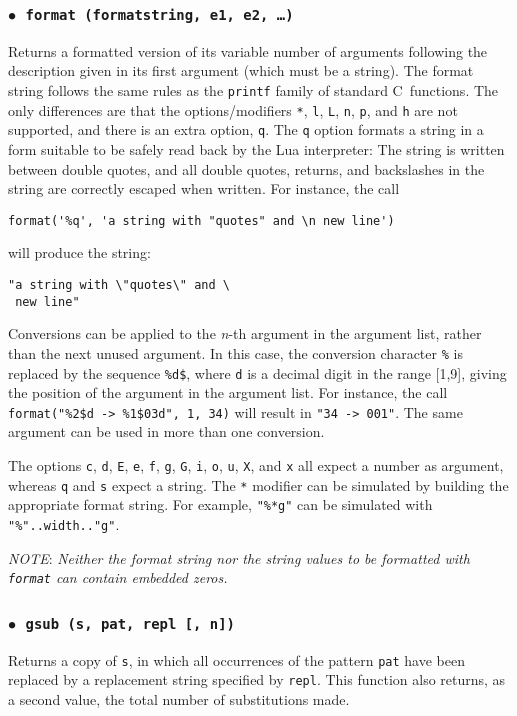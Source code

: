 \documentclass[11pt]{article}
\newcommand{\M}[1]{\rm\emph{#1}}
\newcommand{\T}[1]{{\tt #1}}
\newcommand{\Deffunc}[1]{\index{#1}}
\newcommand{\ff}{$\bullet$\ }
\newcommand{\NOTE}{\par\noindent\emph{NOTE}: }
\begin{document}
\subsubsection*{\ff \T{format (formatstring, e1, e2, \ldots)}}\Deffunc{format}
\label{format}
Returns a formatted version of its variable number of arguments
following the description given in its first argument (which must be a string).
The format string follows the same rules as the \verb|printf| family of
standard C~functions.
The only differences are that the options/modifiers
\verb|*|, \verb|l|, \verb|L|, \verb|n|, \verb|p|,
and \verb|h| are not supported,
and there is an extra option, \verb|q|.
The \verb|q| option formats a string in a form suitable to be safely read
back by the Lua interpreter:
The string is written between double quotes,
and all double quotes, returns, and backslashes in the string
are correctly escaped when written.
For instance, the call
\begin{verbatim}
format('%q', 'a string with "quotes" and \n new line')
\end{verbatim}
will produce the string:
\begin{verbatim}
"a string with \"quotes\" and \
 new line"
\end{verbatim}

Conversions can be applied to the \M{n}-th argument in the argument list,
rather than the next unused argument.
In this case, the conversion character \verb|%| is replaced
by the sequence \verb|%d$|, where \verb|d| is a
decimal digit in the range [1,9],
giving the position of the argument in the argument list.
For instance, the call \verb|format("%2$d -> %1$03d", 1, 34)| will
result in \verb|"34 -> 001"|.
The same argument can be used in more than one conversion.

The options \verb|c|, \verb|d|, \verb|E|, \verb|e|, \verb|f|,
\verb|g|, \verb|G|, \verb|i|, \verb|o|, \verb|u|, \verb|X|, and \verb|x| all
expect a number as argument,
whereas \verb|q| and \verb|s| expect a string.
The \verb|*| modifier can be simulated by building
the appropriate format string.
For example, \verb|"%*g"| can be simulated with
\verb|"%"..width.."g"|.

\NOTE
\emph{Neither the format string nor the string values to be formatted with
\T{format} can contain embedded zeros.}

\subsubsection*{\ff \T{gsub (s, pat, repl [, n])}}
\Deffunc{gsub}
Returns a copy of \verb|s|,
in which all occurrences of the pattern \verb|pat| have been
replaced by a replacement string specified by \verb|repl|.
This function also returns, as a second value,
the total number of substitutions made.
\end{document}
